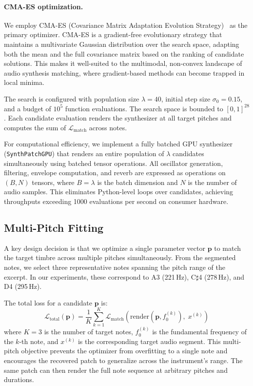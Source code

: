 \paragraph{CMA-ES optimization.} We employ CMA-ES (Covariance Matrix Adaptation Evolution Strategy)~\citep{hansen2016cmaes} as the primary optimizer. CMA-ES is a gradient-free evolutionary strategy that maintains a multivariate Gaussian distribution over the search space, adapting both the mean and the full covariance matrix based on the ranking of candidate solutions. This makes it well-suited to the multimodal, non-convex landscape of audio synthesis matching, where gradient-based methods can become trapped in local minima.

The search is configured with population size $\lambda = 40$, initial step size $\sigma_0 = 0.15$, and a budget of $10^5$ function evaluations. The search space is bounded to $[0, 1]^{28}$. Each candidate evaluation renders the synthesizer at all target pitches and computes the sum of $\mathcal{L}_{\text{match}}$ across notes.

For computational efficiency, we implement a fully batched GPU synthesizer (\texttt{SynthPatchGPU}) that renders an entire population of $\lambda$ candidates simultaneously using batched tensor operations. All oscillator generation, filtering, envelope computation, and reverb are expressed as operations on $(B, N)$ tensors, where $B = \lambda$ is the batch dimension and $N$ is the number of audio samples. This eliminates Python-level loops over candidates, achieving throughputs exceeding 1000 evaluations per second on consumer hardware.

\subsection{Multi-Pitch Fitting}
\label{sec:multipitch}

A key design decision is that we optimize a single parameter vector $\mathbf{p}$ to match the target timbre across multiple pitches simultaneously. From the segmented notes, we select three representative notes spanning the pitch range of the excerpt. In our experiments, these correspond to A3 (221\,Hz), C$\sharp$4 (278\,Hz), and D4 (295\,Hz).

The total loss for a candidate $\mathbf{p}$ is:
\begin{equation}
    \mathcal{L}_{\text{total}}(\mathbf{p}) = \frac{1}{K} \sum_{k=1}^{K} \mathcal{L}_{\text{match}}\!\left(\text{render}(\mathbf{p}, f_0^{(k)}),\; x^{(k)}\right)
    \label{eq:multipitch}
\end{equation}
where $K = 3$ is the number of target notes, $f_0^{(k)}$ is the fundamental frequency of the $k$-th note, and $x^{(k)}$ is the corresponding target audio segment. This multi-pitch objective prevents the optimizer from overfitting to a single note and encourages the recovered patch to generalize across the instrument's range. The same patch can then render the full note sequence at arbitrary pitches and durations.
